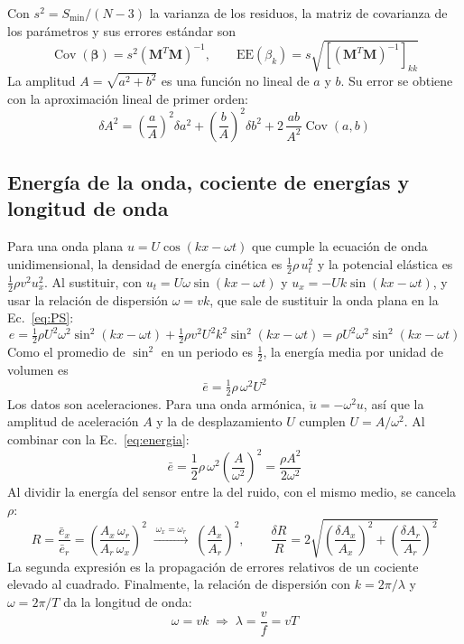 \documentclass[11pt,letterpaper]{article}
\begin{document}
Con $s^2 = S_{\min}/(N-3)$ la varianza de los residuos, la matriz de covarianza de los parámetros y sus errores estándar son
\begin{equation}
\operatorname{Cov}(\boldsymbol\beta) = s^2\left(\mathbf M^T\mathbf M\right)^{-1}, \qquad \mathrm{EE}(\beta_k) = s\sqrt{\left[(\mathbf M^T\mathbf M)^{-1}\right]_{kk}}
\label{eq:ee}
\end{equation}
La amplitud $A = \sqrt{a^2 + b^2}$ es una función no lineal de $a$ y $b$. Su error se obtiene con la aproximación lineal de primer orden:
\begin{equation}
\delta A^2 = \left(\frac{a}{A}\right)^2\delta a^2 + \left(\frac{b}{A}\right)^2\delta b^2 + 2\,\frac{ab}{A^2}\operatorname{Cov}(a,b)
\label{eq:dA}
\end{equation}

\subsection{Energía de la onda, cociente de energías y longitud de onda}
Para una onda plana $u = U\cos(kx - \omega t)$ que cumple la ecuación de onda unidimensional, la densidad de energía cinética es $\tfrac12\rho\,u_t^2$ y la potencial elástica es $\tfrac12\rho v^2 u_x^2$. Al sustituir, con $u_t = U\omega\sin(kx-\omega t)$ y $u_x = -Uk\sin(kx-\omega t)$, y usar la relación de dispersión $\omega = vk$, que sale de sustituir la onda plana en la Ec.~\eqref{eq:PS}:
\begin{equation}
e = \tfrac12\rho U^2\omega^2\sin^2(kx-\omega t) + \tfrac12\rho v^2U^2k^2\sin^2(kx-\omega t) = \rho U^2\omega^2\sin^2(kx-\omega t)
\label{eq:e}
\end{equation}
Como el promedio de $\sin^2$ en un periodo es $\tfrac12$, la energía media por unidad de volumen es
\begin{equation}
\bar e = \tfrac12\rho\,\omega^2 U^2
\label{eq:energia}
\end{equation}
Los datos son aceleraciones. Para una onda armónica, $\ddot u = -\omega^2 u$, así que la amplitud de aceleración $A$ y la de desplazamiento $U$ cumplen $U = A/\omega^2$. Al combinar con la Ec.~\eqref{eq:energia}:
\begin{equation}
\bar e = \frac12\rho\,\omega^2\left(\frac{A}{\omega^2}\right)^2 = \frac{\rho A^2}{2\omega^2}
\label{eq:eA}
\end{equation}
Al dividir la energía del sensor entre la del ruido, con el mismo medio, se cancela $\rho$:
\begin{equation}
R = \frac{\bar e_x}{\bar e_r} = \left(\frac{A_x\,\omega_r}{A_r\,\omega_x}\right)^2 \;\xrightarrow{\ \omega_x = \omega_r\ }\; \left(\frac{A_x}{A_r}\right)^2, \qquad
\frac{\delta R}{R} = 2\sqrt{\left(\frac{\delta A_x}{A_x}\right)^2 + \left(\frac{\delta A_r}{A_r}\right)^2}
\label{eq:R}
\end{equation}
La segunda expresión es la propagación de errores relativos de un cociente elevado al cuadrado. Finalmente, la relación de dispersión con $k = 2\pi/\lambda$ y $\omega = 2\pi/T$ da la longitud de onda:
\begin{equation}
\omega = vk \;\Rightarrow\; \lambda = \frac{v}{f} = vT
\label{eq:lambda}
\end{equation}
\end{document}
